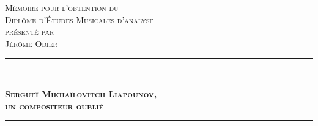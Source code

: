 \begin{titlepage}
\begin{bigcenter}

\vspace*{3.5cm}


\textsc{\large Mémoire pour l'obtention du}\\[0.2cm]
\textsc{\Large Diplôme d'Études Musicales d'analyse}\\[0.2cm]
\textsc{\large présenté par}\\[0.2cm]
\textsc{\Large Jérôme Odier}


\vspace{2.5cm}


\begin{minipage}{1.0\linewidth}
  \rule{\linewidth}{0.5mm}\\
  \begin{bigcenter}
    \textsc{\bfseries\huge Sergueï Mikhaïlovitch Liapounov,}\\[0.5cm]
    \textsc{\bfseries\huge un compositeur oublié}\\[0.5cm]
  \end{bigcenter}
  \rule{\linewidth}{0.5mm}\\
\end{minipage}


\end{bigcenter}
\end{titlepage}
